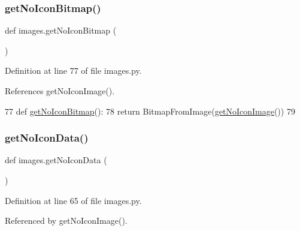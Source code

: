 \subsubsection{\texorpdfstring{get\+No\+Icon\+Bitmap()}{getNoIconBitmap()}}
{\footnotesize\ttfamily def images.\+get\+No\+Icon\+Bitmap (\begin{DoxyParamCaption}{ }\end{DoxyParamCaption})}



Definition at line 77 of file images.\+py.



References get\+No\+Icon\+Image().


\begin{DoxyCode}
77 \textcolor{keyword}{def }\hyperlink{namespaceimages_a442970b306ddb75c881a7d99eacfd7ed}{getNoIconBitmap}():
78     \textcolor{keywordflow}{return} BitmapFromImage(\hyperlink{namespaceimages_ade43d1cef58e60dc22e5fe7728b200e6}{getNoIconImage}())
79 
\end{DoxyCode}
\mbox{\label{namespaceimages_a7b9770da476a15556498ad493df6abb4}} 
\subsubsection{\texorpdfstring{get\+No\+Icon\+Data()}{getNoIconData()}}
{\footnotesize\ttfamily def images.\+get\+No\+Icon\+Data (\begin{DoxyParamCaption}{ }\end{DoxyParamCaption})}



Definition at line 65 of file images.\+py.



Referenced by get\+No\+Icon\+Image().


